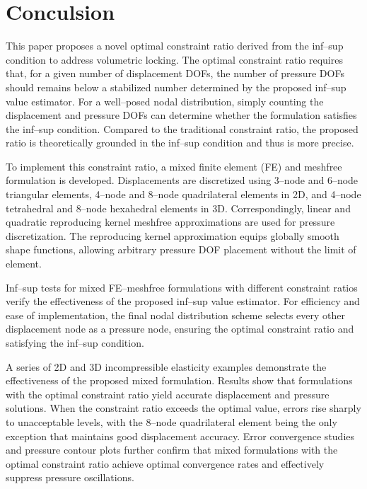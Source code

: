 \section{Conculsion}

This paper proposes a novel optimal constraint ratio derived from the inf--sup condition to address volumetric locking.
The optimal constraint ratio requires that, for a given number of displacement DOFs, the number of pressure DOFs should remains below a stabilized number determined by the proposed inf--sup value estimator.
For a well--posed nodal distribution, simply counting the displacement and pressure DOFs can determine whether the formulation satisfies the inf--sup condition.
Compared to the traditional constraint ratio, the proposed ratio is theoretically grounded in the inf--sup condition and thus is more precise.

To implement this constraint ratio, a mixed finite element (FE) and meshfree formulation is developed.
Displacements are discretized using 3--node and 6--node triangular elements, 4--node and 8--node quadrilateral elements in 2D, and 4--node tetrahedral and 8--node hexahedral elements in 3D.
Correspondingly, linear and quadratic reproducing kernel meshfree approximations are used for pressure discretization.
The reproducing kernel approximation equips globally smooth shape functions, allowing arbitrary pressure DOF placement without the limit of element.

Inf--sup tests for mixed FE--meshfree formulations with different constraint ratios verify the effectiveness of the proposed inf--sup value estimator.
For efficiency and ease of implementation, the final nodal distribution scheme selects every other displacement node as a pressure node,
ensuring the optimal constraint ratio and satisfying the inf--sup condition.

A series of 2D and 3D incompressible elasticity examples demonstrate the effectiveness of the proposed mixed formulation.
Results show that formulations with the optimal constraint ratio yield accurate displacement and pressure solutions.
When the constraint ratio exceeds the optimal value, errors rise sharply to unacceptable levels,
with the 8--node quadrilateral element being the only exception that maintains good displacement accuracy.
Error convergence studies and pressure contour plots further confirm that mixed formulations with the optimal constraint ratio achieve optimal convergence rates and effectively suppress pressure oscillations.
